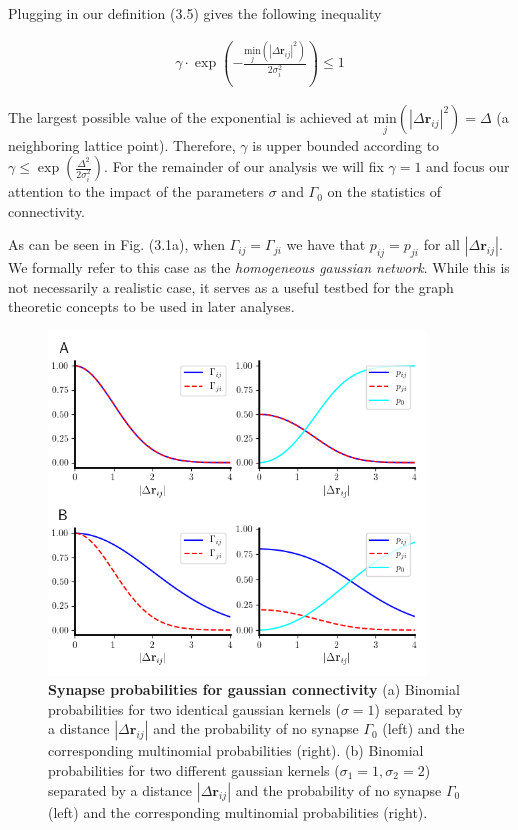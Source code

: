 \documentclass{ucetd}
\begin{document}
Plugging in our definition (3.5) gives the following inequality

\begin{align*}
\gamma\cdot \exp\left(-\frac{\underset{j}{\mathrm{min}}\left(|\Delta\mathbf{r}_{ij}|^{2}\right)}{2\sigma_{i}^{2}} \right) \leq 1
\end{align*}

The largest possible value of the exponential is achieved at $\underset{j}{\mathrm{min}}\left(|\Delta\mathbf{r}_{ij}|^{2}\right) = \Delta$ (a neighboring lattice point). Therefore, $\gamma$ is upper bounded according to $\gamma \leq \exp\left(\frac{\Delta^{2}}{2\sigma_{i}^{2}}\right)$. For the remainder of our analysis we will fix $\gamma = 1$ and focus our attention to the impact of the parameters $\sigma$ and $\Gamma_{0}$ on the statistics of connectivity. 

As can be seen in Fig. (3.1a), when $\Gamma_{ij} = \Gamma_{ji}$ we have that $p_{ij} = p_{ji}$ for all $|\Delta \mathbf{r}_{ij}|$. We formally refer to this case as the \emph{homogeneous gaussian network}. While this is not necessarily a realistic case, it serves as a useful testbed for the graph theoretic concepts to be used in later analyses. 

\clearpage
\begin{figure}[t!]
\centering
\includegraphics[width=100mm]{fig_11}
\caption{\textbf{Synapse probabilities for gaussian connectivity} (a) Binomial probabilities for two identical gaussian kernels ($\sigma=1$) separated by a distance $|\Delta\mathbf{r}_{ij}|$ and the probability of no synapse $\Gamma_{0}$ (left) and the corresponding multinomial probabilities (right). (b) Binomial probabilities for two different gaussian kernels ($\sigma_{1}=1, \sigma_{2}=2$) separated by a distance $|\Delta\mathbf{r}_{ij}|$ and the probability of no synapse $\Gamma_{0}$ (left) and the corresponding multinomial probabilities (right). }
\end{figure}
\end{document}
